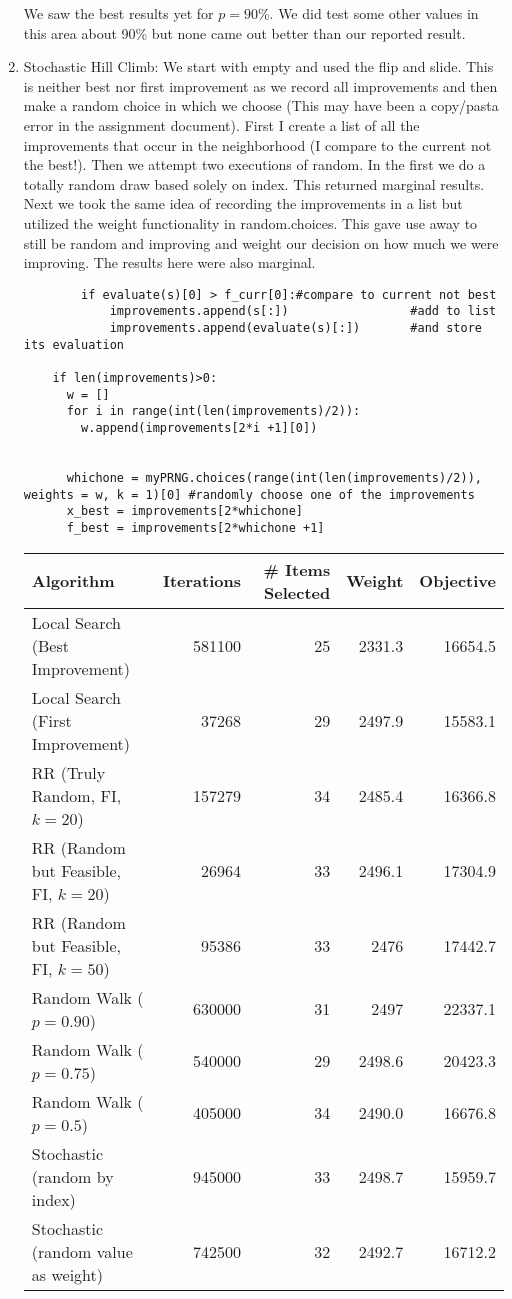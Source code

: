 \documentclass[11pt]{article}
\begin{document}
\begin{enumerate}
We saw the best results yet for $p = 90\%$.  We did test some other values in this area about 90\% but none came out better than our reported result.

\item Stochastic Hill Climb:  We start with empty and used the flip and slide.  This is neither best nor first improvement as we record all improvements and then make a random choice in which we choose (This may have been a copy/pasta error in the assignment document).  First I create a list of all the improvements that occur in the neighborhood (I compare to the current not the best!).  Then we attempt two executions of random.  In the first we do a totally random draw based solely on index.  This returned marginal results.  Next we took the same idea of recording the improvements in a list but utilized the weight functionality in random.choices.  This gave use away to still be random and improving and weight our decision on how much we were improving. The results here were also marginal.
\begin{verbatim}
        if evaluate(s)[0] > f_curr[0]:#compare to current not best
            improvements.append(s[:])                 #add to list
            improvements.append(evaluate(s)[:])       #and store its evaluation

    if len(improvements)>0:
      w = []
      for i in range(int(len(improvements)/2)):
        w.append(improvements[2*i +1][0])


      whichone = myPRNG.choices(range(int(len(improvements)/2)), weights = w, k = 1)[0] #randomly choose one of the improvements
      x_best = improvements[2*whichone]
      f_best = improvements[2*whichone +1]
\end{verbatim}
\begin{tabular}{lrrrr}
Algorithm&Iterations&\# Items Selected&Weight&Objective\\ \hline
Local Search (Best Improvement)&581100&25&2331.3&16654.5\\ 
Local Search (First Improvement)&37268&29&2497.9&15583.1\\
RR (Truly Random, FI, $k=20$) & 157279&34&2485.4&16366.8\\
RR (Random but Feasible, FI, $k = 20$)& 26964&33&2496.1&17304.9\\
RR (Random but Feasible, FI, $k = 50$)& 95386&33&2476&17442.7\\
Random Walk ($p = 0.90$) & 630000&31&2497&22337.1\\
Random Walk ($p = 0.75$) & 540000&29&2498.6&20423.3\\
Random Walk ($p = 0.5$) & 405000&34&2490.0&16676.8\\
Stochastic (random by index) &945000&33&2498.7&15959.7\\
Stochastic (random value as weight)&742500&32&2492.7&16712.2\\
\hline
\end{tabular}

\end{enumerate}
\end{document}
